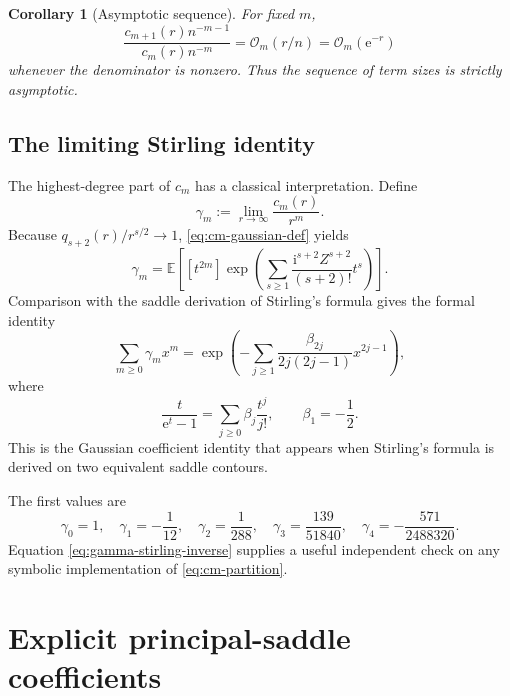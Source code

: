 \documentclass[11pt,a4paper]{article}
\newtheorem{corollary}[theorem]{Corollary}
\theoremstyle{definition}
\theoremstyle{remark}
\newcommand{\E}{\mathbb E}
\newcommand{\ii}{\mathrm i}
\newcommand{\ee}{\mathrm e}
\newcommand{\BigO}{\mathcal O}
\newcommand{\coef}[2]{[#1^{#2}]}
\newcommand{\Bern}{\beta}
\begin{document}
\begin{corollary}[Asymptotic sequence]\label{cor:genuine-scale}
For fixed \(m\),
\[
 \frac{c_{m+1}(r)n^{-m-1}}{c_m(r)n^{-m}}
 =\BigO_m(r/n)=\BigO_m(\ee^{-r})
\]
whenever the denominator is nonzero.  Thus the sequence of term sizes is
strictly asymptotic.
\end{corollary}

\subsection{The limiting Stirling identity}

The highest-degree part of \(c_m\) has a classical interpretation.  Define
\begin{equation}\label{eq:gamma-m-def}
 \gamma_m:=\lim_{r\to\infty}\frac{c_m(r)}{r^m}.
\end{equation}
Because \(q_{s+2}(r)/r^{s/2}\to1\), \cref{eq:cm-gaussian-def} yields
\begin{equation}\label{eq:gamma-gaussian}
 \gamma_m=
 \E\!\left[
  \coef{t}{2m}
  \exp\!\left(
    \sum_{s\ge1}\frac{\ii^{s+2}Z^{s+2}}{(s+2)!}t^s
  \right)
 \right].
\end{equation}
Comparison with the saddle derivation of Stirling's formula gives the formal
identity
\begin{equation}\label{eq:gamma-stirling-inverse}
 \boxed{
 \sum_{m\ge0}\gamma_m x^m
 =\exp\!\left(
   -\sum_{j\ge1}\frac{\Bern_{2j}}{2j(2j-1)}x^{2j-1}
 \right),}
\end{equation}
where
\begin{equation}\label{eq:bernoulli-convention}
 \frac{t}{\ee^t-1}=\sum_{j\ge0}\Bern_j\frac{t^j}{j!},
 \qquad \Bern_1=-\frac12.
\end{equation}
This is the Gaussian coefficient identity that appears when Stirling's formula
is derived on two equivalent saddle contours.

The first values are
\begin{equation}\label{eq:gamma-values}
 \gamma_0=1,
 \quad \gamma_1=-\frac1{12},
 \quad \gamma_2=\frac1{288},
 \quad \gamma_3=\frac{139}{51840},
 \quad \gamma_4=-\frac{571}{2488320}.
\end{equation}
Equation \cref{eq:gamma-stirling-inverse} supplies a useful independent check on
any symbolic implementation of \cref{eq:cm-partition}.

\section{Explicit principal-saddle coefficients}\label{sec:explicit}
\end{document}
